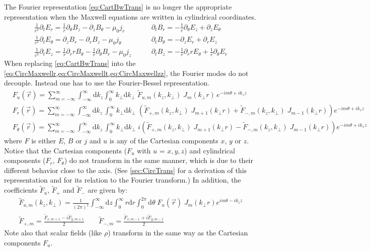 \documentclass[a4paper]{article}   	%
\newcommand{\ir}{\frac{1}{r}}
\newcommand{\Integ}[1]{\int_{-\infty}^{\infty} \!\!\!\!\!
  \mathrm{d}#1}
\newcommand{\RInteg}[1]{\int_{0}^{\infty} \!\!\!\!\! #1\mathrm{d}#1}
\newcommand{\TInteg}[1]{\int_{0}^{2\pi} \!\!\!\!\! \mathrm{d}#1}
\begin{document}
The Fourier representation \cref{eq:CartBwTrans} is no longer the
appropriate representation when the Maxwell equations are written in cylindrical coordinates.
\begin{align}
\frac{1}{c^2}\partial_t E_r = \ir \partial_\theta B_z - \partial_z B_\theta - \mu_0  j_r \qquad&   
\partial_t B_r = -\ir \partial_\theta E_z + \partial_z E_\theta \label{eq:CircMaxwellr} \\
\frac{1}{c^2}\partial_t E_\theta = \partial_z B_r - \partial_r B_z - \mu_0  j_\theta \qquad &   
\partial_t B_\theta = -\partial_z E_r + \partial_r E_z \label{eq:CircMaxwellt}  \\
\frac{1}{c^2}\partial_t E_z = \ir\partial_r r B_\theta - \ir\partial_\theta B_r - \mu_0  j_z \qquad & 
\partial_t B_z = -\ir\partial_r r E_\theta + \ir\partial_\theta E_r \label{eq:CircMaxwellzz} 
\end{align}
When replacing
\cref{eq:CartBwTrans} into the \cref{eq:CircMaxwellr,eq:CircMaxwellt,eq:CircMaxwellzz}, the Fourier modes do not decouple. Instead one has to use the Fourier-Bessel representation.
\begin{align}
& F_u(\vec{r}) = \sum_{m=-\infty}^{\infty} \Integ{k_z}
\RInteg{k_\perp }\; \tilde{F}_{u,m}(k_z,k_\perp ) \; J_m(k_\perp r)\, e^{-im\theta + ik_z z} 
\label{eq:CircBwTransu} \\
& F_r(\vec{r}) = \sum_{m=-\infty}^{\infty} \Integ{k_z}\,\RInteg{k_\perp }\;
\left( \tilde{F}_{+,m}(k_z,k_\perp )\; J_{m+1}(k_\perp r) +\tilde{F}_{-,m}(k_z,k_\perp )\; J_{m-1}(k_\perp r)
\right)  e^{-im\theta +ik_z z}
\label{eq:CircBwTransr} \\
& F_\theta(\vec{r}) = \sum_{m=-\infty}^{\infty} \Integ{k_z}\,\RInteg{k_\perp }\;
i\left( \tilde{F}_{+,m}(k_z,k_\perp )\; J_{m+1}(k_\perp r) - \tilde{F}_{-,m}(k_z,k_\perp )\; J_{m-1}(k_\perp r)
\right)  e^{-im\theta +ik_z z} 
\label{eq:CircBwTranst}
\end{align}
where $F$ is either $E$, $B$ or $j$ and $u$ is any of the
Cartesian components $x$, $y$ or $z$. Notice that the Cartesian
components ($F_u$ with $u$ = $x,y,z$) and cylindrical components
($F_r$, $F_\theta$) do not transform in the same manner, which is due
to their different behavior close to the axis. (See
\cref{sec:CircTrans} for a derivation of this representation and for
its relation to the Fourier transform.) In addition, the coefficients $\tilde{F}_u$, $\tilde{F}_+$ and
 $\tilde{F}_{-}$ are given by:
\begin{align}
\tilde{F}_{u,m}(k_z,k_\perp ) = \frac{1}{(2\pi)^2} \Integ{z} \RInteg{r}
\TInteg{\theta} \;F_u(\vec{r})\; J_m(k_\perp r) e^{im\theta
 - i k_z z} \label{eq:CircFwTransu} \\
\tilde{F}_{+,m} = \frac{\tilde{F}_{x,m+1} -
    i\tilde{F}_{y,m+1}}{2} \qquad \tilde{F}_{-,m} = \frac{\tilde{F}_{x,m-1} +
    i\tilde{F}_{y,m-1}}{2}
\label{eq:CircFwTranspm} 
\end{align}
\noindent Note also that scalar fields (like $\rho$) transform in the same way as the Cartesian components $F_u$.
\end{document}

